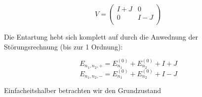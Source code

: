 \[V =  \begin{pmatrix} I+J & 0 \\
 0 & I-J \\
\end{pmatrix} \]

Die Entartung hebt sich komplett auf durch die Anwednung der Störungsrechnung (bis zur 1 Ordnung):

\[E_{n_1,n_2,+} = E_{n_1}^{(0)}+E_{n_2}^{(0)}+I+J\]
\[E_{n_1,n_2,-} = E_{n_1}^{(0)}+E_{n_2}^{(0)}+I-J\]


Einfacheitshalber betrachten wir den Grundzustand





 